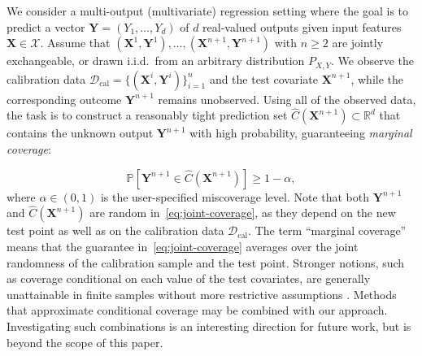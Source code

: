 {\color{blue} We consider a multi-output (multivariate) regression setting where the
goal is to predict a vector
$\mathbf{Y}=(Y_1,\ldots,Y_d)$ of $d$ real-valued outputs given input
features $\mathbf{X}\in\mathcal{X}$.
Assume that
$(\mathbf{X}^1,\mathbf{Y}^1),\ldots,(\mathbf{X}^{n+1},\mathbf{Y}^{n+1})$ with $n\geq 2$ are jointly exchangeable, or drawn
i.i.d.\ from an arbitrary distribution $P_{X,Y}$. We observe the
calibration data $\mathcal D_{\mathrm{cal}}=\{(\mathbf{X}^i,\mathbf{Y}^i)\}_{i=1}^n$
and the test covariate $\mathbf{X}^{n+1}$, while the corresponding outcome
$\mathbf{Y}^{n+1}$ remains unobserved.
Using all of the observed data, the task is to construct a reasonably tight prediction set $\hat{C}(\mathbf{X}^{n+1}) \subset \mathbb{R}^d$ that contains the unknown output $\mathbf{Y}^{n+1}$ with high probability, guaranteeing \emph{marginal coverage}:

\begin{equation}
\mathbb{P}\!\left[ \mathbf{Y}^{n+1} \in \hat{C}(\mathbf{X}^{n+1}) \right] \ge 1 - \alpha,
\label{eq:joint-coverage}
\end{equation}
where $\alpha \in (0,1)$ is the user-specified miscoverage level.  
Note that both $\mathbf{Y}^{n+1}$ and $\hat{C}(\mathbf{X}^{n+1})$ are random in~\eqref{eq:joint-coverage}, as they depend on the new test point as well as on the calibration data $\mathcal{D}_{\mathrm{cal}}$.  
The term ``marginal coverage'' means that the guarantee in~\eqref{eq:joint-coverage} averages over the joint randomness of the calibration sample and the test point. Stronger notions, such as coverage conditional on each value of the test covariates, are generally unattainable in finite samples without more restrictive assumptions \citep{foygel2021limits}. Methods that approximate conditional coverage \citep{Romano2020With,gibbs2025conformal} may be combined with our approach. Investigating such combinations is an interesting direction for future work, but is beyond the scope of this paper.}

